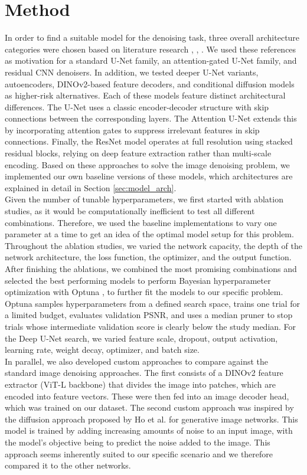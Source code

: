\documentclass[a4paper,10pt]{article}
\begin{document}
\section{Method}
In order to find a suitable model for the denoising task, three overall architecture 
categories were chosen based on literature research \cite{10.1007/978-3-319-24574-4_28}, 
\cite{Oktayetal2018}, \cite{TIAN2020251}. We used these references as motivation for 
a standard U-Net family, an attention-gated U-Net family, and residual CNN denoisers. 
In addition, we tested deeper U-Net variants, autoencoders, DINOv2-based feature 
decoders, and conditional diffusion models as higher-risk alternatives.
Each of these models feature distinct architectural differences. The U-Net uses a 
classic encoder-decoder structure with skip connections between the corresponding 
layers. The Attention U-Net extends this by incorporating attention gates to suppress 
irrelevant features in skip connections. Finally, the ResNet model operates at full 
resolution using stacked residual blocks, relying on deep feature extraction rather 
than multi-scale encoding.
Based on these approaches to solve the image denoising problem, we implemented our 
own baseline versions of these models, which architectures are explained in detail in 
Section \ref{sec:model_arch}.\\
Given the number of tunable hyperparameters, we first started with ablation studies, 
as it would be computationally inefficient to test all different combinations. 
Therefore, we used the baseline implementations to vary one parameter at a time to 
get an idea of the optimal model setup for this problem. Throughout the ablation 
studies, we varied the network capacity, the depth of the network architecture, the 
loss function, the optimizer, and the output function. After finishing the ablations, 
we combined the most promising combinations and selected the best performing models 
to perform Bayesian hyperparameter optimization with Optuna \cite{7352306}, to further fit the models to our 
specific problem. Optuna samples hyperparameters from a defined search space, trains 
one trial for a limited budget, evaluates validation PSNR, and uses a median pruner 
to stop trials whose intermediate validation score is clearly below the study median. 
For the Deep U-Net search, we varied feature scale, dropout, output activation, 
learning rate, weight decay, optimizer, and batch size.\\
In parallel, we also developed custom approaches to compare against the standard image 
denoising approaches. The first consists of a DINOv2 \cite{oquab:hal-04376640} feature 
extractor (ViT-L backbone) that divides the image into patches, which are encoded into 
feature vectors. These were then fed into an image decoder head, which was trained on 
our dataset. The second custom approach was inspired by the diffusion approach proposed 
by Ho et al. \cite{ho2020ddpm} for generative image networks. This model is trained by 
adding increasing amounts of noise to an input image, with the model's objective being 
to predict the noise added to the image. This approach seems inherently suited to our 
specific scenario and we therefore compared it to the other networks.
\end{document}
